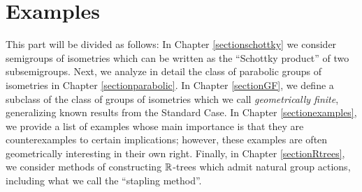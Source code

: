\part{Examples}
\label{partexamples}


This part will be divided as follows: In Chapter \ref{sectionschottky} we consider semigroups of isometries which can be written as the ``Schottky product'' of two subsemigroups. Next, we analyze in detail the class of parabolic groups of isometries in Chapter \ref{sectionparabolic}. 
In Chapter \ref{sectionGF}, we define a subclass of the class of groups of isometries which we call \emph{geometrically finite}, generalizing known results from the Standard Case.
In Chapter \ref{sectionexamples}, we provide a list of examples whose main importance is that they are counterexamples to certain implications; however, these examples are often geometrically interesting in their own right. 
Finally, in Chapter \ref{sectionRtrees}, we consider methods of constructing $\R$-trees which admit natural group actions, including what we call the ``stapling method''. 

